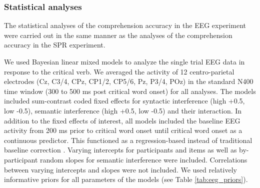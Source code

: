 \documentclass[a4paper, man, floatsintext]{apa7}
\begin{document}
\subsubsection{Statistical analyses}
The statistical analyses of the comprehension accuracy in the EEG experiment were carried out in the same manner as the analyses of the comprehension accuracy in the SPR experiment.

We used Bayesian linear mixed models to analyze the single trial EEG data in response to the critical verb. We averaged the activity of 12 centro-parietal electrodes (Cz, C3/4, CPz, CP1/2, CP5/6, Pz, P3/4, POz) in the standard N400 time window (300 to 500 ms post critical word onset) for all analyses. The models included sum-contrast coded fixed effects for syntactic interference (high +0.5, low -0.5), semantic interference (high +0.5, low -0.5) and their interaction. In addition to the fixed effects of interest, all models included the baseline EEG activity from 200 ms prior to critical word onset until critical word onset as a continuous predictor. This functioned as a regression-based instead of traditional baseline correction \citep{alday2019}. Varying intercepts for participants and items as well as by-participant random slopes for semantic interference were included. Correlations between varying intercepts and slopes were not included. We used relatively informative priors for all parameters of the models (see Table \ref{tab:eeg_priors}). 
\end{document}
